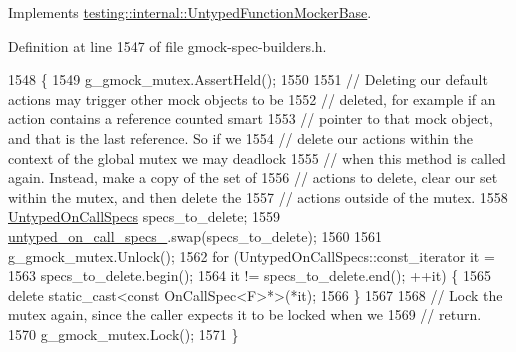 Implements \hyperlink{classtesting_1_1internal_1_1UntypedFunctionMockerBase_a40ddd95736946a7951033aa89a7b617f}{testing\+::internal\+::\+Untyped\+Function\+Mocker\+Base}.



Definition at line 1547 of file gmock-\/spec-\/builders.\+h.


\begin{DoxyCode}
1548                                                     \{
1549     g\_gmock\_mutex.AssertHeld();
1550 
1551     \textcolor{comment}{// Deleting our default actions may trigger other mock objects to be}
1552     \textcolor{comment}{// deleted, for example if an action contains a reference counted smart}
1553     \textcolor{comment}{// pointer to that mock object, and that is the last reference. So if we}
1554     \textcolor{comment}{// delete our actions within the context of the global mutex we may deadlock}
1555     \textcolor{comment}{// when this method is called again. Instead, make a copy of the set of}
1556     \textcolor{comment}{// actions to delete, clear our set within the mutex, and then delete the}
1557     \textcolor{comment}{// actions outside of the mutex.}
1558     \hyperlink{classtesting_1_1internal_1_1UntypedFunctionMockerBase_a29cc87ed60ad0218432aa777abba7dbb}{UntypedOnCallSpecs} specs\_to\_delete;
1559     \hyperlink{classtesting_1_1internal_1_1UntypedFunctionMockerBase_aed2a1913f6c03fd47c8900039556be34}{untyped\_on\_call\_specs\_}.swap(specs\_to\_delete);
1560 
1561     g\_gmock\_mutex.Unlock();
1562     \textcolor{keywordflow}{for} (UntypedOnCallSpecs::const\_iterator it =
1563              specs\_to\_delete.begin();
1564          it != specs\_to\_delete.end(); ++it) \{
1565       \textcolor{keyword}{delete} \textcolor{keyword}{static\_cast<}\textcolor{keyword}{const }OnCallSpec<F>*\textcolor{keyword}{>}(*it);
1566     \}
1567 
1568     \textcolor{comment}{// Lock the mutex again, since the caller expects it to be locked when we}
1569     \textcolor{comment}{// return.}
1570     g\_gmock\_mutex.Lock();
1571   \}
\end{DoxyCode}
\mbox{\label{classtesting_1_1internal_1_1FunctionMockerBase_a744318106e20b346f4f1efbf5a601644}} 
